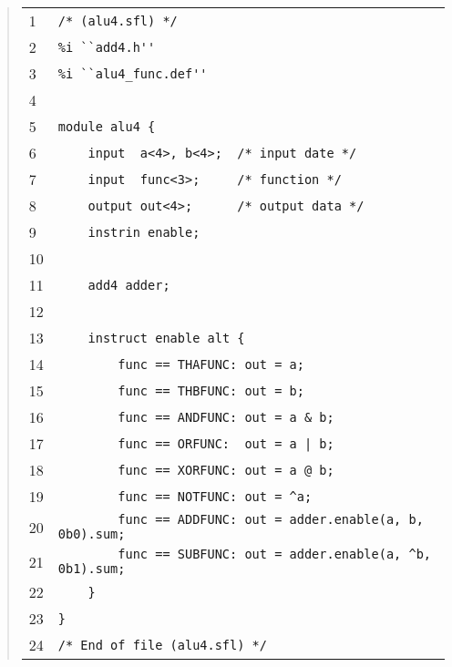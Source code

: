%
\begin{quote}
\begin{tabular}{l|l}
   1 & \verb|/* (alu4.sfl) */|   \\[-3pt]
   2 & \verb|%i ``add4.h''|        \\[-3pt]
   3 & \verb|%i ``alu4_func.def''|         \\[-3pt]
   4 & \verb||   \\[-3pt]
   5 & \verb|module alu4 {|      \\[-3pt]
   6 & \verb|    input  a<4>, b<4>;  /* input date */|   \\[-3pt]
   7 & \verb|    input  func<3>;     /* function */|     \\[-3pt]
   8 & \verb|    output out<4>;      /* output data */|          \\[-3pt]
   9 & \verb|    instrin enable;|        \\[-3pt]
  10 & \verb||   \\[-3pt]
  11 & \verb|    add4 adder;|    \\[-3pt]
  12 & \verb||   \\[-3pt]
  13 & \verb|    instruct enable alt {|          \\[-3pt]
  14 & \verb|        func == THAFUNC: out = a;|          \\[-3pt]
  15 & \verb|        func == THBFUNC: out = b;|          \\[-3pt]
  16 & \verb|        func == ANDFUNC: out = a & b;|      \\[-3pt]
  17 & \verb+        func == ORFUNC:  out = a | b;+      \\[-3pt]
  18 & \verb|        func == XORFUNC: out = a @ b;|      \\[-3pt]
  19 & \verb|        func == NOTFUNC: out = ^a;|         \\[-3pt]
  20 & \verb|        func == ADDFUNC: out = adder.enable(a, b, 0b0).sum;|       
 \\[-3pt]
  21 & \verb|        func == SUBFUNC: out = adder.enable(a, ^b, 0b1).sum;|      
 \\[-3pt]
  22 & \verb|    }|      \\[-3pt]
  23 & \verb|}|          \\[-3pt]
  24 & \verb|/* End of file (alu4.sfl) */|       \\[-3pt]
\end{tabular}
\end{quote}
%
